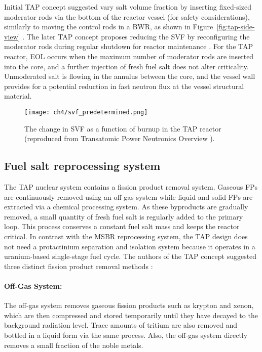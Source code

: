 Initial \gls{TAP} concept suggested vary salt volume fraction by inserting 
fixed-sized moderator rods via the bottom of the reactor vessel (for safety 
considerations), similarly to moving the control rods in a \gls{BWR}, as shown 
in Figure~\ref{fig:tap-side-view} 
\cite{transatomic_power_corporation_neutronics_2016}. The later \gls{TAP} 
concept proposes reducing the \gls{SVF} by reconfiguring the moderator rods 
during regular shutdown for reactor maintenance 
\cite{betzler_assessment_2017-1}. For the 
\gls{TAP} reactor, \gls{EOL} occurs when the maximum number of moderator rods 
are inserted into the core, and a further injection of fresh fuel salt does 
not alter criticality. Unmoderated salt is flowing in the annulus between the 
core, and the vessel wall provides for a potential reduction in fast neutron 
flux at the vessel structural material.
\begin{figure}[t] %
	\texttt{[image: ch4/svf\_predetermined.png]}
	\caption{The change in SVF as a function of burnup in the \gls{TAP} 
	reactor (reproduced from Transatomic Power Neutronics Overview  
	\cite{transatomic_power_corporation_neutronics_2016}).}
	\label{fig:svf-predetermined}
\end{figure}


\subsection{Fuel salt reprocessing system}
The \gls{TAP} nuclear system contains a fission product removal system. 
Gaseous \glspl{FP} are continuously removed using an off-gas system while 
liquid and 
solid \glspl{FP} are extracted via a chemical processing system. As these 
byproducts are gradually removed, a small quantity of fresh fuel salt is 
regularly added to the primary loop. This process conserves a constant fuel 
salt mass and keeps the reactor critical. In contrast with the \gls{MSBR} 
reprocessing system, the \gls{TAP} design does not need a protactinium 
separation and isolation system because it operates in a uranium-based 
single-stage fuel cycle. The authors of the \gls{TAP} concept suggested three 
distinct fission product removal methods 
\cite{transatomic_power_corporation_neutronics_2016}:
\paragraph*{Off-Gas System:} The off-gas system removes gaseous fission 
products such as krypton and xenon, which are then compressed and stored 
temporarily until they have decayed to the background radiation level. Trace 
amounts of tritium are also removed and bottled in a liquid form via the same 
process. Also, the off-gas system directly removes a small fraction of the 
noble metals.
